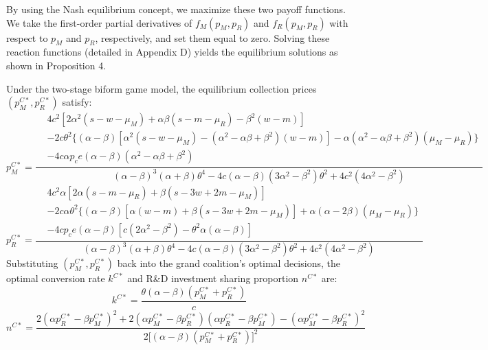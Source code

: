 \documentclass[authoryear,preprint,review,times,10pt]{elsarticle}
\begin{document}
By using the Nash equilibrium concept, we maximize these two payoff functions. We take the first-order partial derivatives of $f_M(p_M, p_R)$ and $f_R(p_M, p_R)$ with respect to $p_M$ and $p_R$, respectively, and set them equal to zero. Solving these reaction functions (detailed in Appendix D) yields the equilibrium solutions as shown in Proposition 4.

\begin{prop}
\label{prop:biform}
Under the two-stage biform game model, the equilibrium collection prices $(p_M^{C*}, p_R^{C*})$ satisfy:
\begin{equation}
p_M^{C*} = \frac{
\displaystyle
\begin{aligned}
&4c^2 \left[ 2\alpha^2(s - w - \mu_M) + \alpha\beta(s - m - \mu_R) - \beta^2(w - m) \right] \\
&- 2c\theta^2 \Big\{ (\alpha-\beta) \left[ \alpha^2(s - w - \mu_M) - (\alpha^2 - \alpha\beta + \beta^2)(w - m) \right] - \alpha(\alpha^2 - \alpha\beta + \beta^2)(\mu_M - \mu_R) \Big\} \\
&- 4c\alpha p_c e (\alpha - \beta)(\alpha^2 - \alpha\beta + \beta^2)
\end{aligned}
}{
\displaystyle (\alpha-\beta)^3(\alpha+\beta)\theta^4 - 4c(\alpha-\beta)(3\alpha^2-\beta^2)\theta^2 + 4c^2(4\alpha^2-\beta^2)
}
\end{equation}
\begin{equation}
p_R^{C*} = \frac{
\displaystyle
\begin{aligned}
&4c^2\alpha \left[ 2\alpha(s - m - \mu_R) + \beta(s - 3w + 2m - \mu_M) \right] \\
&- 2c\alpha\theta^2 \Big\{ (\alpha-\beta) \left[ \alpha(w - m) + \beta(s - 3w + 2m - \mu_M) \right] + \alpha(\alpha - 2\beta)(\mu_M - \mu_R) \Big\} \\
&- 4c p_c e (\alpha - \beta) \left[ c(2\alpha^2 - \beta^2) - \theta^2\alpha(\alpha - \beta) \right]
\end{aligned}
}{
\displaystyle (\alpha-\beta)^3(\alpha+\beta)\theta^4 - 4c(\alpha-\beta)(3\alpha^2-\beta^2)\theta^2 + 4c^2(4\alpha^2-\beta^2)
}
\end{equation}
Substituting $(p_M^{C*}, p_R^{C*})$ back into the grand coalition's optimal decisions, the optimal conversion rate $k^{C*}$ and R\&D investment sharing proportion $n^{C*}$ are:
\begin{equation}
k^{C*} = \frac{\theta(\alpha-\beta)(p_M^{C*} + p_R^{C*})}{c}
\end{equation}
\begin{equation}
n^{C*} = \frac{2(\alpha p_R^{C*} - \beta p_M^{C*})^2 + 2(\alpha p_M^{C*} - \beta p_R^{C*})(\alpha p_R^{C*} - \beta p_M^{C*}) - (\alpha p_M^{C*} - \beta p_R^{C*})^2}{2 \big[ (\alpha-\beta)(p_M^{C*} + p_R^{C*}) \big]^2}
\end{equation}
\end{prop}
\end{document}
